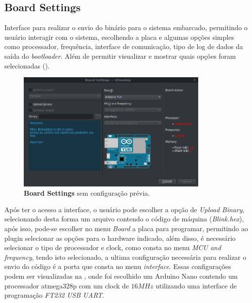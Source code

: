 \subsection{Board Settings}

Interface para realizar o envio do binário para o sistema embarcado, permitindo o usuário interagir com o sistema, escolhendo a placa e algumas opções simples como processador, frequência, interface de comunicação, tipo de log de dados da saída do \textit{bootloader}. Além de permitir visualizar e mostrar quais opções foram selecionadas ().

\begin{figure}[!htb]
  \centering
  \includegraphics[width=0.85\textwidth]{figuras/boardsettings.png}
  \caption[Board Settings com configuração inicial]{\textbf{Board Settings} sem configuração prévia.}
  \label{fig:boardsettings}
\end{figure}

Após ter o acesso a interface, o usuário pode escolher a opção de \textit{Upload Binary}, selecionando desta forma um arquivo contendo o código de máquina (\textit{Blink.hex}), após isso, pode-se escolher no menu \textit{Board} a placa para programar, permitindo ao plugin selecionar as opções para o hardware indicado, além disso, é necessário selecionar o tipo de processador e clock, como consta no menu \textit{MCU and frequency}, tendo isto selecionado, a ultima configuração necessária para realizar o envio do código é a porta que consta no menu \textit{interface}. Essas configurações podem ser visualizadas na , onde foi escolhido um Arduino Nano contendo um processador atmega328p com um clock de $16MHz$ utilizando uma interface de programação \textit{FT232 USB UART}.

